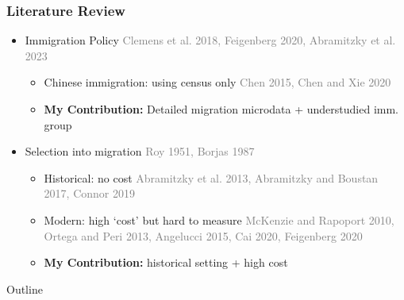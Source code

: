\documentclass[xcolor=dvipsnames, compress, 12pt, aspectratio=169, handout]{beamer}
\begin{document}
\begin{frame}
    \frametitle{Literature Review}
    \begin{itemize}
        \item Immigration Policy \small \textcolor{gray}{Clemens et al. 2018, Feigenberg 2020, Abramitzky et al. 2023}
        \vspace{2mm}
        \begin{itemize}
            \item Chinese immigration: using census only \footnotesize \textcolor{gray}{Chen 2015, Chen and Xie 2020}
            \vspace{1mm} \small 
            \item \textbf{My Contribution:} Detailed migration microdata + understudied imm. group 
        \end{itemize}
        \vspace{2mm} \normalsize 
        \vspace{2mm} 
        \item Selection into migration \small \textcolor{gray}{Roy 1951, Borjas 1987}
        \vspace{2mm}
        \begin{itemize}
            \item Historical: no cost \footnotesize \textcolor{gray}{Abramitzky et al. 2013, Abramitzky and Boustan 2017, Connor 2019} \vspace{1mm}
            \item \small Modern: high `cost' but hard to measure \footnotesize \textcolor{gray}{McKenzie and Rapoport 2010, Ortega and Peri 2013, Angelucci 2015, Cai 2020, Feigenberg 2020} \vspace{1mm} 
            \item \small \textbf{My Contribution:} historical setting + high cost 
        \end{itemize} \normalsize 
    \end{itemize}
\end{frame}

\begin{frame}[plain]{Outline}
    \tableofcontents
    \addtocounter{framenumber}{-1}
\end{frame}

\end{document}
